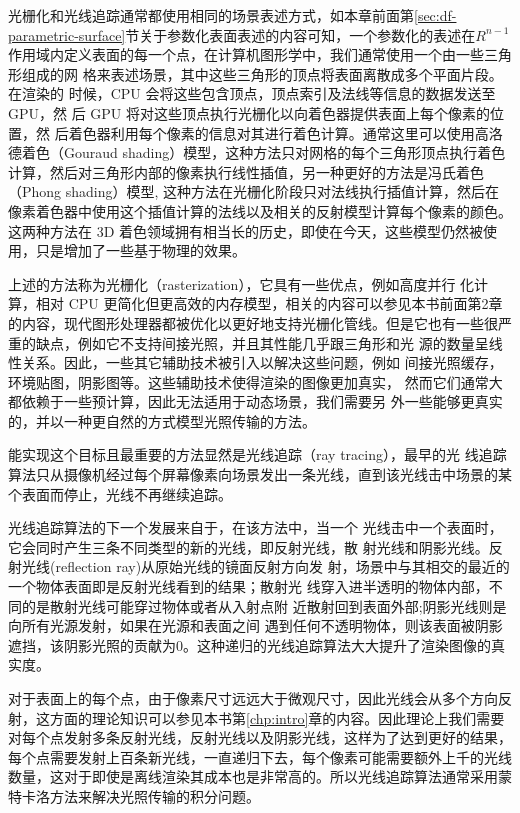 光栅化和光线追踪通常都使用相同的场景表述方式，如本章前面第\ref{sec:df-parametric-surface}节关于参数化表面表述的内容可知，一个参数化的表述在$R^{n−1}$作用域内定义表面的每一个点，在计算机图形学中，我们通常使用一个由一些三角形组成的网 格来表述场景，其中这些三角形的顶点将表面离散成多个平面片段。在渲染的 时候，CPU 会将这些包含顶点，顶点索引及法线等信息的数据发送至 GPU，然 后 GPU 将对这些顶点执行光栅化以向着色器提供表面上每个像素的位置，然 后着色器利用每个像素的信息对其进行着色计算。通常这里可以使用高洛德着色（Gouraud shading）模型，这种方法只对网格的每个三角形顶点执行着色计算，然后对三角形内部的像素执行线性插值，另一种更好的方法是冯氏着色（Phong shading）模型, 这种方法在光栅化阶段只对法线执行插值计算，然后在像素着色器中使用这个插值计算的法线以及相关的反射模型计算每个像素的颜色。这两种方法在 3D 着色领域拥有相当长的历史，即使在今天，这些模型仍然被使用，只是增加了一些基于物理的效果。

上述的方法称为光栅化（rasterization），它具有一些优点，例如高度并行 化计算，相对 CPU 更简化但更高效的内存模型，相关的内容可以参见本书前面第2章的内容，现代图形处理器都被优化以更好地支持光栅化管线。但是它也有一些很严重的缺点，例如它不支持间接光照，并且其性能几乎跟三角形和光 源的数量呈线性关系。因此，一些其它辅助技术被引入以解决这些问题，例如 间接光照缓存，环境贴图，阴影图等。这些辅助技术使得渲染的图像更加真实， 然而它们通常大都依赖于一些预计算，因此无法适用于动态场景，我们需要另 外一些能够更真实的，并以一种更自然的方式模型光照传输的方法。

能实现这个目标且最重要的方法显然是光线追踪（ray tracing），最早的光 线追踪算法只从摄像机经过每个屏幕像素向场景发出一条光线，直到该光线击中场景的某个表面而停止，光线不再继续追踪。

光线追踪算法的下一个发展来自于\cite{a:Animprovedilluminationmodelforshadeddisplay}，在该方法中，当一个 光线击中一个表面时，它会同时产生三条不同类型的新的光线，即反射光线，散 射光线和阴影光线。反射光线(reflection ray)从原始光线的镜面反射方向发 射，场景中与其相交的最近的一个物体表面即是反射光线看到的结果；散射光 线穿入进半透明的物体内部，不同的是散射光线可能穿过物体或者从入射点附 近散射回到表面外部;阴影光线则是向所有光源发射，如果在光源和表面之间 遇到任何不透明物体，则该表面被阴影遮挡，该阴影光照的贡献为0。这种递归的光线追踪算法大大提升了渲染图像的真实度。

对于表面上的每个点，由于像素尺寸远远大于微观尺寸，因此光线会从多个方向反射，这方面的理论知识可以参见本书第\ref{chp:intro}章的内容。因此理论上我们需要对每个点发射多条反射光线，反射光线以及阴影光线，这样为了达到更好的结果，每个点需要发射上百条新光线，一直递归下去，每个像素可能需要额外上千的光线数量，这对于即使是离线渲染其成本也是非常高的。所以光线追踪算法通常采用蒙特卡洛方法来解决光照传输的积分问题。

